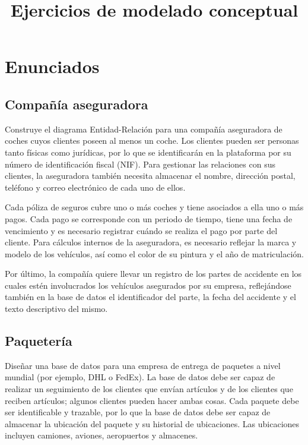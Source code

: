 \documentclass{db-practice}
\title{Ejercicios de modelado conceptual}
\begin{document}
\maketitle

\section{Enunciados}


\subsection{Compañía aseguradora}
Construye el diagrama Entidad-Relación para una compañía aseguradora de coches cuyos clientes poseen al menos un coche. Los clientes pueden ser personas tanto físicas como jurídicas, por lo que se identificarán en la plataforma por su número de identificación fiscal (NIF). Para gestionar las relaciones con sus clientes, la aseguradora también necesita almacenar el nombre, dirección postal, teléfono y correo electrónico de cada uno de ellos.

Cada póliza de seguros cubre uno o más coches y tiene asociados a ella uno o más pagos. Cada pago se corresponde con un periodo de tiempo, tiene una fecha de vencimiento y es necesario registrar cuándo se realiza el pago por parte del cliente. Para cálculos internos de la aseguradora, es necesario reflejar la marca y modelo de los vehículos, así como el color de su pintura y el año de matriculación.

Por último, la compañía quiere llevar un registro de los partes de accidente en los cuales estén involucrados los vehículos asegurados por su empresa, reflejándose también en la base de datos el identificador del parte, la fecha del accidente y el texto descriptivo del mismo.

\subsection{Paquetería}
Diseñar una base de datos para una empresa de entrega de paquetes a nivel mundial (por ejemplo, DHL o FedEx). La base de datos debe ser capaz de realizar un seguimiento de los clientes que envían artículos y de los clientes que reciben artículos; algunos clientes pueden hacer ambas cosas. Cada paquete debe ser identificable y trazable, por lo que la base de datos debe ser capaz de almacenar la ubicación del paquete y su historial de ubicaciones. Las ubicaciones incluyen camiones, aviones, aeropuertos y almacenes.
\end{document}
